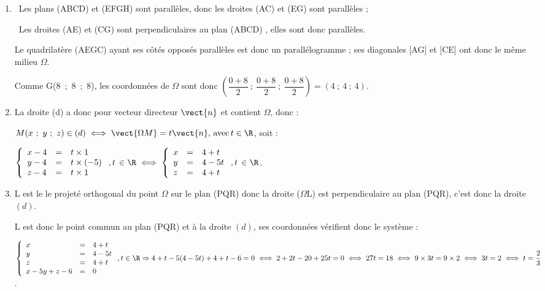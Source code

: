 \begin{enumerate}
\item %
\starredbullet~Les plans (ABCD) et (EFGH) sont parallèles, donc les droites (AC) et (EG) sont parallèles ;

\starredbullet~Les droites (AE) et (CG) sont perpendiculaires au plan (ABCD) , elles sont donc  parallèles.

Le quadrilatère (AEGC) ayant ses côtés opposés parallèles est donc un parallélogramme  ; ses diagonales [AG] et [CE] ont donc le même milieu $\Omega$.

Comme G(8~;~8~;~8), les coordonnées de $\Omega$ sont donc $\left(\dfrac{0 + 8}{2}~;~\dfrac{0 + 8}{2}~;~\dfrac{0 + 8}{2}\right) = (4~;~4~;~4)$.
\item %
La droite (d) a donc pour vecteur directeur $\vect{n}$ et contient $\Omega$, donc :

$M(x~;~y~;~z) \in (d) \iff \vect{\Omega M} = t\vect{n}, \, \text{avec}\, t \in \R$, soit :

$\left\{\begin{array}{l c l}
x - 4&=&t \times 1\\
y - 4&=&t \times (- 5)\\
z - 4&=&t \times 1
\end{array}\right., t\, \in \R \iff \left\{\begin{array}{l c l}
x &=&4 + t\\
y &=&4 - 5t\\
z &=&4 + t
\end{array}\right., t \, \in \R $.
\item %
L est le le projeté orthogonal du point $\Omega$ sur le plan (PQR) donc la droite ($\Omega$L) est perpendiculaire au plan (PQR), c'est donc la droite $(d)$.

L est donc le point commun au plan (PQR) et à la droite $(d)$, ses coordonnées vérifient donc le système :

$\left\{\begin{array}{l c l}
x &=&4 + t\\
y &=&4 - 5t\\
z &=&4 + t\\
 x - 5y + z  - 6 &=& 0
\end{array}\right., t \in \R \Rightarrow 4 + t  - 5(4 - 5t) + 4 + t - 6 = 0 \iff 2 + 2t - 20 + 25t = 0 \iff 27t = 18 \iff 9 \times 3t = 9 \times 2 \iff 3t = 2 \iff t = \dfrac{2}{3}$.


\end{enumerate}
